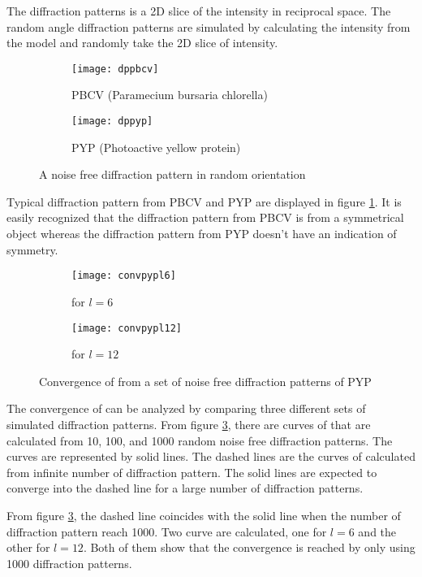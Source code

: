The diffraction patterns is a 2D slice of the intensity in reciprocal space. The random angle diffraction patterns are simulated by calculating the intensity from the model and randomly take the 2D slice of intensity. 
\begin{figure}[h]
\begin{subfigure}{.5\textwidth}
  \centering
  \texttt{[image: dppbcv]}
  \caption{PBCV (Paramecium bursaria chlorella)}
\end{subfigure}
\begin{subfigure}{.5\textwidth}
  \centering
  \texttt{[image: dppyp]}
  \caption{PYP (Photoactive yellow protein)}
\end{subfigure}
\caption{A noise free diffraction pattern in random orientation}
\label{fig:simdp}
\end{figure}
Typical diffraction pattern from PBCV and PYP are displayed in figure \ref{fig:simdp}. It is easily recognized that the diffraction pattern from PBCV is from a symmetrical object whereas the diffraction pattern from PYP doesn't have an indication of symmetry. 

\begin{figure}[h]
\begin{subfigure}{.5\textwidth}
  \centering
  \texttt{[image: convpypl6]}
  \caption{\Blq for $l=6$}
  \label{fig:convpypl6}
\end{subfigure}
\begin{subfigure}{.5\textwidth}
  \centering
  \texttt{[image: convpypl12]}
  \caption{\Blq for $l=12$}
\end{subfigure}
\caption{Convergence of \Blq from a set of noise free diffraction patterns of PYP}
\label{fig:convpyp}
\end{figure}

The convergence of \Blq can be analyzed by comparing three different sets of simulated diffraction patterns. From figure \ref{fig:convpyp}, there are curves of \Blq that are calculated from 10, 100, and 1000 random noise free diffraction patterns. The curves are represented by solid lines. The dashed lines are the curves of \Blq calculated from infinite number of diffraction pattern. The solid lines are expected to converge into the dashed line for a large number of diffraction patterns.  

From figure \ref{fig:convpyp}, the dashed line coincides with the solid line when the number of diffraction pattern reach 1000. Two \Blq curve are calculated, one for $l=6$ and the other for $l=12$. Both of them show that the convergence is reached by only using 1000 diffraction patterns.

